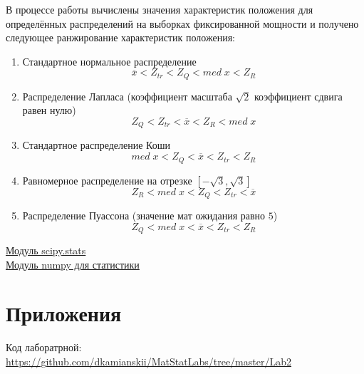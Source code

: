 \documentclass[a4]{article}
\begin{document}
\par В процессе работы вычислены значения характеристик положения для определённых распределений на выборках фиксированной мощности и получено следующее ранжирование характеристик положения:

\begin{enumerate}
    \item Стандартное нормальное распределение $$\overline{x} < Z_{tr} < Z_Q < med\;x < Z_R$$
    
    \item Распределение Лапласа (коэффициент масштаба $\sqrt{2}$ коэффициент сдвига равен нулю) $$Z_Q < Z_{tr} < \overline{x} <  Z_R <med\;x$$
    
    \item Стандартное распределение Коши $$med\;x < Z_Q <  \overline{x} < Z_{tr} < Z_R$$
    
    \item Равномерное распределение на отрезке $\left[-\sqrt{3},\sqrt{3}\right]$ $$Z_R < med\;x < Z_Q < Z_{tr} < \overline{x}$$
    
    \item Распределение Пуассона (значение мат ожидания равно $5$) $$Z_Q < med\;x < \overline{x} < Z_{tr} < Z_R$$
    
\end{enumerate}



\begin{thebibliography}{}
    \href{https://docs.scipy.org/doc/scipy/reference/stats.html}{Модуль scipy.stats}\\
    \href{https://docs.scipy.org/doc/numpy/reference/routines.statistics.html}{Модуль numpy для статистики}
\end{thebibliography}

\section{Приложения}


Код лаборатрной:\; \url{https://github.com/dkamianskii/MatStatLabs/tree/master/Lab2}

%
\end{document}
